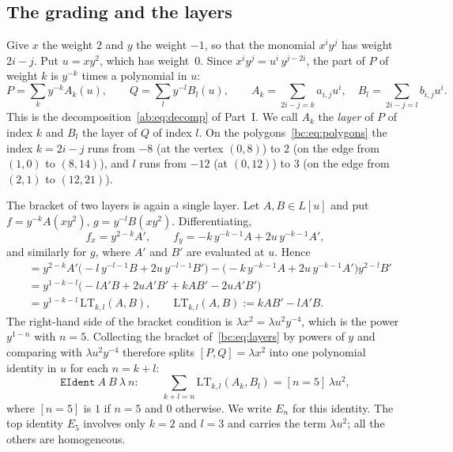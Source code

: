 \documentclass[a4paper,11pt]{article}
\theoremstyle{jsplain}
\theoremstyle{jsdef}
\theoremstyle{jsrem}
\begin{document}
\subsection{The grading and the layers}

Give $x$ the weight $2$ and $y$ the weight $-1$, so that the monomial $x^iy^j$ has weight $2i-j$. Put $u=xy^2$, which has weight~$0$. Since $x^iy^j=u^i\,y^{j-2i}$, the part of $P$ of weight $k$ is $y^{-k}$ times a polynomial in $u$:
\begin{equation}\label{bc:eq:layers}
P=\sum_k y^{-k}A_k(u),\qquad Q=\sum_l y^{-l}B_l(u),\qquad A_k=\sum_{2i-j=k}a_{i,j}u^i,\quad B_l=\sum_{2i-j=l}b_{i,j}u^i .
\end{equation}
This is the decomposition~\eqref{ab:eq:decomp} of Part~I. We call $A_k$ the \emph{layer} of $P$ of index $k$ and $B_l$ the layer of $Q$ of index $l$. On the polygons~\eqref{bc:eq:polygons} the index $k=2i-j$ runs from $-8$ (at the vertex $(0,8)$) to $2$ (on the edge from $(1,0)$ to $(8,14)$), and $l$ runs from $-12$ (at $(0,12)$) to $3$ (on the edge from $(2,1)$ to $(12,21)$).

The bracket of two layers is again a single layer. Let $A,B\in L[u]$ and put $f=y^{-k}A(xy^2)$, $g=y^{-l}B(xy^2)$. Differentiating,
\[
f_x=y^{2-k}A',\qquad f_y=-k\,y^{-k-1}A+2u\,y^{-k-1}A',
\]
and similarly for $g$, where $A'$ and $B'$ are evaluated at $u$. Hence
\begin{align*}
[f,g]&=y^{2-k}A'\bigl(-l\,y^{-l-1}B+2u\,y^{-l-1}B'\bigr)-\bigl(-k\,y^{-k-1}A+2u\,y^{-k-1}A'\bigr)y^{2-l}B'\\
&=y^{1-k-l}\bigl(-lA'B+2uA'B'+kAB'-2uA'B'\bigr)\\
&=y^{1-k-l}\,\mathrm{LT}_{k,l}(A,B),\qquad \mathrm{LT}_{k,l}(A,B):=kAB'-lA'B .
\end{align*}
The right-hand side of the bracket condition is $\lambda x^2=\lambda u^2y^{-4}$, which is the power $y^{1-n}$ with $n=5$. Collecting the bracket of~\eqref{bc:eq:layers} by powers of $y$ and comparing with $\lambda u^2y^{-4}$ therefore splits $[P,Q]=\lambda x^2$ into one polynomial identity in $u$ for each $n=k+l$:
\begin{equation}\label{bc:eq:eident}
\texttt{EIdent}\ A\ B\ \lambda\ n:\qquad \sum_{k+l=n}\mathrm{LT}_{k,l}(A_k,B_l)=[n=5]\,\lambda u^2,
\end{equation}
where $[n=5]$ is $1$ if $n=5$ and $0$ otherwise. We write $E_n$ for this identity. The top identity $E_5$ involves only $k=2$ and $l=3$ and carries the term $\lambda u^2$; all the others are homogeneous.
\end{document}
